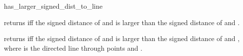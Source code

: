 \begin{ccRefFunction}{has_larger_signed_dist_to_line}

          {returns  iff the signed distance of 
           and  is larger than the signed distance of 
            and .}

          {returns  iff the signed distance of 
           and  is larger than the signed distance of 
            and , where  is the directed line
           through points  and .}


\end{ccRefFunction}


